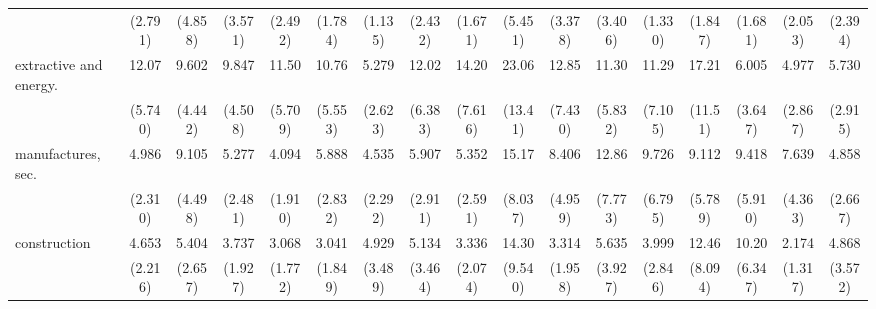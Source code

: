 {\begin{tabular}{l*{16}{c}}
                    &     (2.791)         &     (4.858)         &     (3.571)         &     (2.492)         &     (1.784)         &     (1.135)         &     (2.432)         &     (1.671)         &     (5.451)         &     (3.378)         &     (3.406)         &     (1.330)         &     (1.847)         &     (1.681)         &     (2.053)         &     (2.394)         \\
[1em]
extractive and energy.&       12.07\sym{***}&       9.602\sym{***}&       9.847\sym{***}&       11.50\sym{***}&       10.76\sym{***}&       5.279\sym{***}&       12.02\sym{***}&       14.20\sym{***}&       23.06\sym{***}&       12.85\sym{***}&       11.30\sym{***}&       11.29\sym{***}&       17.21\sym{***}&       6.005\sym{**} &       4.977\sym{**} &       5.730\sym{***}\\
                    &     (5.740)         &     (4.442)         &     (4.508)         &     (5.709)         &     (5.553)         &     (2.623)         &     (6.383)         &     (7.616)         &     (13.41)         &     (7.430)         &     (5.832)         &     (7.105)         &     (11.51)         &     (3.647)         &     (2.867)         &     (2.915)         \\
[1em]
manufactures, sec.  &       4.986\sym{***}&       9.105\sym{***}&       5.277\sym{***}&       4.094\sym{**} &       5.888\sym{***}&       4.535\sym{**} &       5.907\sym{***}&       5.352\sym{***}&       15.17\sym{***}&       8.406\sym{***}&       12.86\sym{***}&       9.726\sym{**} &       9.112\sym{***}&       9.418\sym{***}&       7.639\sym{***}&       4.858\sym{**} \\
                    &     (2.310)         &     (4.498)         &     (2.481)         &     (1.910)         &     (2.832)         &     (2.292)         &     (2.911)         &     (2.591)         &     (8.037)         &     (4.959)         &     (7.773)         &     (6.795)         &     (5.789)         &     (5.910)         &     (4.363)         &     (2.667)         \\
[1em]
construction        &       4.653\sym{**} &       5.404\sym{***}&       3.737\sym{*}  &       3.068         &       3.041         &       4.929\sym{*}  &       5.134\sym{*}  &       3.336         &       14.30\sym{***}&       3.314\sym{*}  &       5.635\sym{*}  &       3.999         &       12.46\sym{***}&       10.20\sym{***}&       2.174         &       4.868\sym{*}  \\
                    &     (2.216)         &     (2.657)         &     (1.927)         &     (1.772)         &     (1.849)         &     (3.489)         &     (3.464)         &     (2.074)         &     (9.540)         &     (1.958)         &     (3.927)         &     (2.846)         &     (8.094)         &     (6.347)         &     (1.317)         &     (3.572)         \\

\end{tabular}}
